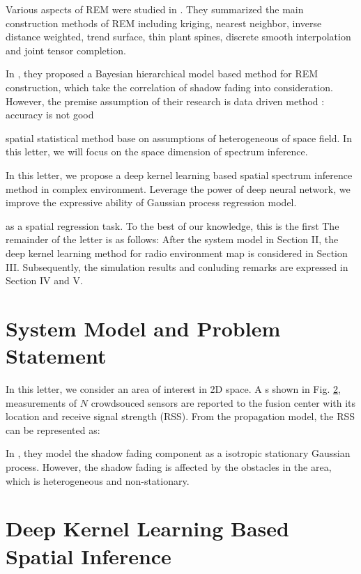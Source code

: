 \documentclass[journal, oneside, twocolumn]{IEEEtran}
\begin{document}
Various aspects of REM were studied in \cite{Li2018}. They summarized the main construction methods of REM including kriging, nearest neighbor, inverse distance weighted, trend surface, thin plant spines, discrete smooth interpolation and joint tensor completion. 

In \cite{Xu2021}, they proposed a Bayesian hierarchical model based method for REM construction, which take the correlation of shadow fading into consideration. However, the premise assumption of their research is 
data driven method : accuracy is not good

spatial statistical method base on assumptions of heterogeneous of space field. 
In this letter, we will focus on the space dimension of spectrum inference.


In this letter, we propose a deep kernel learning based spatial spectrum inference method in complex environment. Leverage the power of deep neural network, we improve the expressive ability of Gaussian process regression model.

as a spatial regression task.
To the best of our knowledge, this is the first 
The remainder of the letter is as follows: After the system model in Section II, the deep kernel learning method for radio environment map is considered in Section III. Subsequently, the simulation results and conluding remarks are expressed in Section IV and V.



\section{System Model and Problem Statement}

In this letter, we consider an area of interest in 2D space. A s shown in Fig. \ref{}, measurements of $N$ crowdsouced sensors are reported to the fusion center with its location and receive signal strength (RSS). 
From the propagation model, the RSS can be represented as:

In , they model the shadow fading component as a isotropic stationary Gaussian process. However, the shadow fading is affected by the obstacles in the area, which is heterogeneous and non-stationary.
\section{Deep Kernel Learning Based Spatial Inference}
\end{document}
